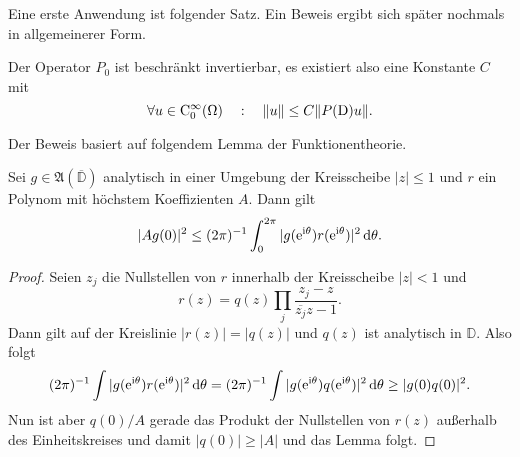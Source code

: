 Eine erste Anwendung ist folgender Satz. Ein Beweis ergibt sich später nochmals in allgemeinerer Form.

\begin{thm}\label{thm:1:1.8}
Der Operator $P_0$ ist beschränkt invertierbar, es existiert also eine Konstante $C$ mit
\begin{equation}
   \forall u\in\mathrm C_0^\infty(\Omega)\quad:\quad \|u\|\le C\| P(\mathrm D) u\|.
\end{equation}
\end{thm}

Der Beweis basiert auf folgendem Lemma der Funktionentheorie. 
\begin{lem}
Sei $g\in\mathfrak A(\overline{\mathbb D})$ analytisch in einer Umgebung der Kreisscheibe $|z|\le 1$  und $r$ ein Polynom mit höchstem Koeffizienten $A$. Dann gilt
\begin{equation}
   |Ag(0)|^2 \le (2\pi)^{-1} \int_0^{2\pi} |g(\mathrm e^{\mathrm i\theta}) r(\mathrm e^{\mathrm i\theta})|^2 \,\mathrm d\theta.
\end{equation}
\end{lem}
\begin{proof}
Seien $z_j$ die Nullstellen von $r$ innerhalb der Kreisscheibe $|z|<1$ und
\begin{equation}
    r(z) = q(z) \prod_{j} \frac{z_j-z}{\overline{z_j}z-1}.
\end{equation} 
Dann gilt auf der Kreislinie $|r(z)|=|q(z)|$ und $q(z)$ ist analytisch in $\mathbb D$. Also folgt
\begin{equation}
  (2\pi)^{-1} \int  |g(\mathrm e^{\mathrm i\theta}) r(\mathrm e^{\mathrm i\theta})|^2 \,\mathrm d\theta = (2\pi)^{-1} \int  |g(\mathrm e^{\mathrm i\theta}) q(\mathrm e^{\mathrm i\theta})|^2 \,\mathrm d\theta \ge |g(0)q(0)|^2.
\end{equation}
Nun ist aber $q(0)/A$ gerade das Produkt der Nullstellen von $r(z)$ außerhalb des Einheitskreises und damit $|q(0)|\ge |A|$ und das Lemma folgt.
\end{proof}

